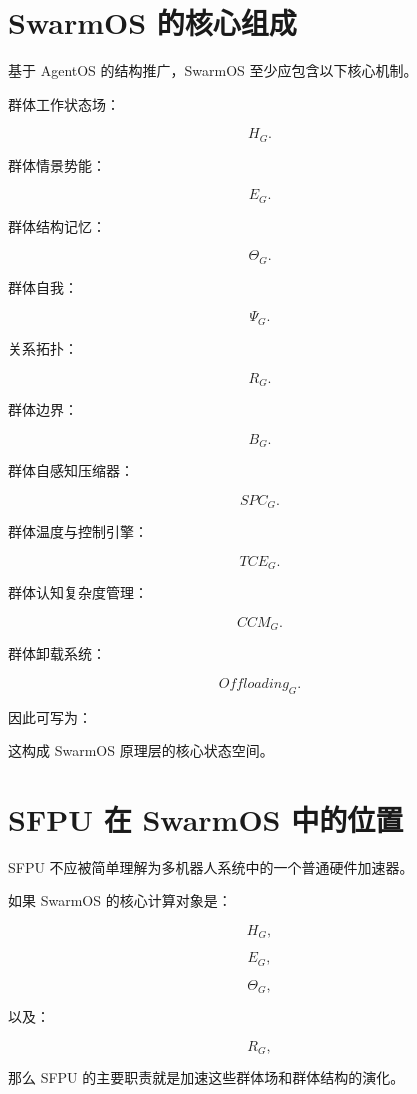 \section{SwarmOS 的核心组成}

基于 AgentOS 的结构推广，SwarmOS 至少应包含以下核心机制。

群体工作状态场：

\[
H_G.
\]

群体情景势能：

\[
E_G.
\]

群体结构记忆：

\[
\Theta_G.
\]

群体自我：

\[
\Psi_G.
\]

关系拓扑：

\[
R_G.
\]

群体边界：

\[
B_G.
\]

群体自感知压缩器：

\[
SPC_G.
\]

群体温度与控制引擎：

\[
TCE_G.
\]

群体认知复杂度管理：

\[
CCM_G.
\]

群体卸载系统：

\[
Offloading_G.
\]

因此可写为：

\begin{statementbox}
\centering
{}
\end{statementbox}

这构成 SwarmOS 原理层的核心状态空间。


\section{SFPU 在 SwarmOS 中的位置}

SFPU 不应被简单理解为多机器人系统中的一个普通硬件加速器。

如果 SwarmOS 的核心计算对象是：

\[
H_G,
\]

\[
E_G,
\]

\[
\Theta_G,
\]

以及：

\[
R_G,
\]

那么 SFPU 的主要职责就是加速这些群体场和群体结构的演化。

